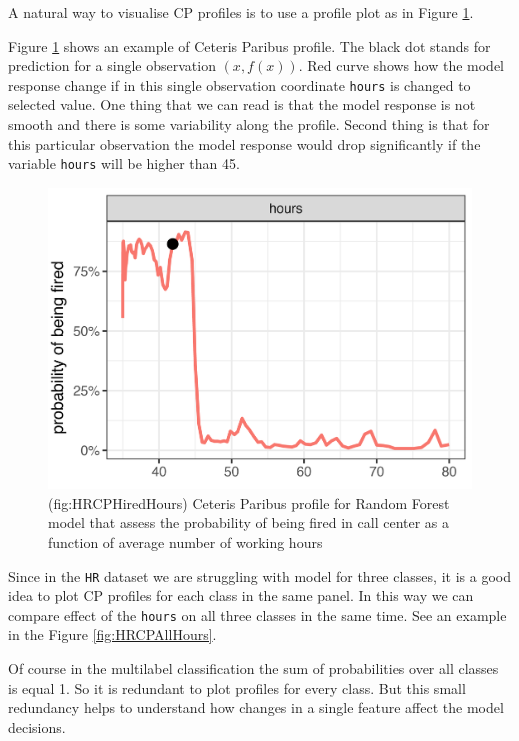 \documentclass[]{krantz}
\theoremstyle{definition}
\theoremstyle{definition}
\theoremstyle{definition}
\theoremstyle{remark}
\begin{document}
A natural way to visualise CP profiles is to use a profile plot as in
Figure \ref{fig:HRCPFiredHours}.

Figure \ref{fig:HRCPFiredHours} shows an example of Ceteris Paribus
profile. The black dot stands for prediction for a single observation
\((x, f(x))\). Red curve shows how the model response change if in this
single observation coordinate \texttt{hours} is changed to selected
value. One thing that we can read is that the model response is not
smooth and there is some variability along the profile. Second thing is
that for this particular observation the model response would drop
significantly if the variable \texttt{hours} will be higher than 45.

\begin{figure}

{\centering \includegraphics[width=0.5\linewidth]{figure/HR_cp_fired_hours} 

}

\caption{(fig:HRCPHiredHours) Ceteris Paribus profile for Random Forest model that assess the probability of being fired in call center as a function of average number of working hours}\label{fig:HRCPFiredHours}
\end{figure}

Since in the \texttt{HR} dataset we are struggling with model for three
classes, it is a good idea to plot CP profiles for each class in the
same panel. In this way we can compare effect of the \texttt{hours} on
all three classes in the same time. See an example in the Figure
\ref{fig:HRCPAllHours}.

Of course in the multilabel classification the sum of probabilities over
all classes is equal 1. So it is redundant to plot profiles for every
class. But this small redundancy helps to understand how changes in a
single feature affect the model decisions.
\end{document}
